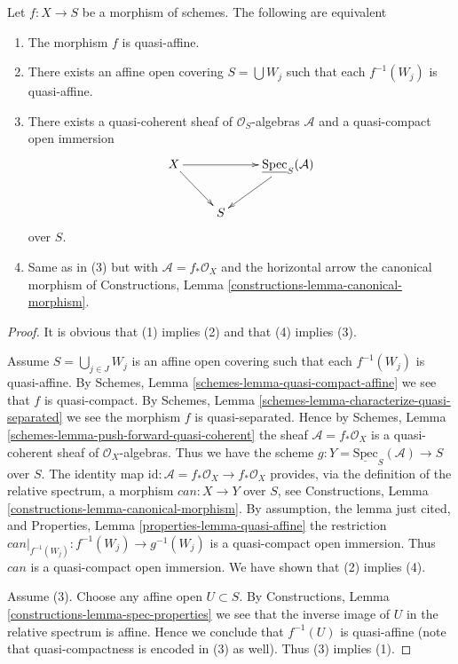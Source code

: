 \begin{lemma}
\label{lemma-characterize-quasi-affine}
Let $f : X \to S$ be a morphism of schemes.
The following are equivalent
\begin{enumerate}
\item The morphism $f$ is quasi-affine.
\item There exists an affine open covering $S = \bigcup W_j$
such that each $f^{-1}(W_j)$ is quasi-affine.
\item There exists a quasi-coherent sheaf of $\mathcal{O}_S$-algebras
$\mathcal{A}$ and a quasi-compact open immersion
$$
\xymatrix{
X \ar[rr] \ar[rd] & & \underline{\text{Spec}}_S(\mathcal{A}) \ar[dl] \\
& S &
}
$$
over $S$.
\item Same as in (3) but with $\mathcal{A} = f_*\mathcal{O}_X$
and the horizontal arrow the canonical morphism of
Constructions, Lemma \ref{constructions-lemma-canonical-morphism}.
\end{enumerate}
\end{lemma}

\begin{proof}
It is obvious that (1) implies (2) and that (4) implies (3).

\medskip\noindent
Assume $S = \bigcup_{j \in J} W_j$ is an affine open covering such that
each $f^{-1}(W_j)$ is quasi-affine. By
Schemes, Lemma \ref{schemes-lemma-quasi-compact-affine} we see
that $f$ is quasi-compact. By
Schemes, Lemma \ref{schemes-lemma-characterize-quasi-separated}
we see the morphism $f$ is quasi-separated. Hence by
Schemes, Lemma \ref{schemes-lemma-push-forward-quasi-coherent} the
sheaf $\mathcal{A} = f_*\mathcal{O}_X$ is a quasi-coherent sheaf
of $\mathcal{O}_X$-algebras. Thus we have the scheme
$g : Y = \underline{\text{Spec}}_S(\mathcal{A}) \to S$ over $S$.
The identity map
$\text{id} : \mathcal{A} = f_*\mathcal{O}_X \to f_*\mathcal{O}_X$
provides, via the definition of the relative spectrum,
a morphism $can : X \to Y$ over $S$, see
Constructions, Lemma \ref{constructions-lemma-canonical-morphism}.
By assumption, the lemma just cited, and
Properties, Lemma \ref{properties-lemma-quasi-affine}
the restriction $can|_{f^{-1}(W_j)} : f^{-1}(W_j) \to g^{-1}(W_j)$
is a quasi-compact open immersion. Thus $can$ is a quasi-compact
open immersion. We have shown that (2) implies (4).

\medskip\noindent
Assume (3). Choose any affine open $U \subset S$.
By Constructions, Lemma \ref{constructions-lemma-spec-properties}
we see that the inverse image of $U$ in the relative spectrum
is affine. Hence we conclude that $f^{-1}(U)$ is quasi-affine
(note that quasi-compactness is encoded in (3) as well).
Thus (3) implies (1).
\end{proof}

